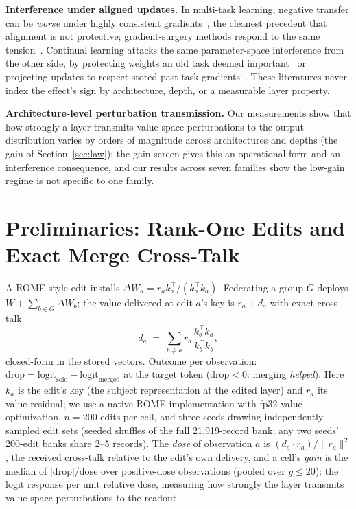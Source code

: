 \documentclass[preprint,12pt]{elsarticle}
\begin{document}
\textbf{Interference under aligned updates.} In multi-task learning, negative transfer can
be \emph{worse} under highly consistent gradients~\cite{forkmerge2023}, the cleanest
precedent that alignment is not protective; gradient-surgery methods respond to the same
tension~\cite{pcgrad2020,cagrad2021}. Continual learning attacks the same parameter-space
interference from the other side, by protecting weights an old task deemed
important~\cite{ewc2017} or projecting updates to respect stored past-task
gradients~\cite{gem2017}. These literatures never index the effect's sign by architecture,
depth, or a measurable layer property.

\textbf{Architecture-level perturbation transmission.} Our measurements show that how
strongly a layer transmits value-space perturbations to the output distribution varies
by orders of magnitude across architectures and depths (the gain of
Section~\ref{sec:law}); the gain screen gives this an operational form and an
interference consequence, and our results across seven families show the low-gain
regime is not specific to one family.

\section{Preliminaries: Rank-One Edits and Exact Merge Cross-Talk}\label{sec:prelim}
A ROME-style edit installs $\Delta W_a = r_a k_a^{\top}/(k_a^{\top}k_a)$. Federating a
group $G$ deploys $W + \sum_{b\in G}\Delta W_b$; the value delivered at edit $a$'s key
is $r_a + d_a$ with exact cross-talk
\begin{equation}
d_a \;=\; \sum_{b\neq a} r_b\,\frac{k_b^{\top}k_a}{k_b^{\top}k_b},
\label{eq:crosstalk}
\end{equation}
closed-form in the stored vectors. Outcome per observation:
$\mathrm{drop}=\mathrm{logit}_{\mathrm{solo}}-\mathrm{logit}_{\mathrm{merged}}$ at the
target token ($\mathrm{drop}<0$: merging \emph{helped}). Here $k_a$ is the edit's key (the subject representation at the edited layer) and $r_a$ its
value residual; we use a native ROME implementation with fp32 value optimization, $n=200$
edits per cell, and three seeds drawing independently sampled edit sets (seeded
shuffles of the full 21{,}919-record bank; any two seeds' 200-edit banks share 2--5
records). The \emph{dose} of observation
$a$ is $(d_a\!\cdot\!r_a)/\lVert r_a\rVert^2$, the received cross-talk relative to the
edit's own delivery, and a cell's \emph{gain} is the median of $|\mathrm{drop}|/\text{dose}$
over positive-dose observations (pooled over $g\leq20$): the logit response per unit
relative dose, measuring how strongly the layer transmits value-space perturbations to the
readout.
\end{document}
